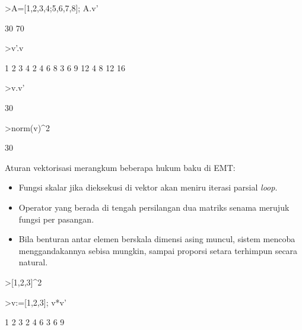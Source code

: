 \documentclass[a4paper,11pt,oneside,enabledeprecatedfontcommands]{scrbook}
\newenvironment{eulernotebook}{}{}
\newenvironment{eulercomment}{\par\medskip\noindent}{\par\medskip}
\begin{document}
\begin{eulernotebook}
\begin{eulerprompt}
>A=[1,2,3,4;5,6,7,8]; A.v'
\end{eulerprompt}
\begin{euleroutput}
           30 
           70 
\end{euleroutput}
\begin{eulerprompt}
>v'.v
\end{eulerprompt}
\begin{euleroutput}
            1             2             3             4 
            2             4             6             8 
            3             6             9            12 
            4             8            12            16 
\end{euleroutput}
\begin{eulerprompt}
>v.v'
\end{eulerprompt}
\begin{euleroutput}
30
\end{euleroutput}
\begin{eulerprompt}
>norm(v)^2
\end{eulerprompt}
\begin{euleroutput}
30
\end{euleroutput}
\begin{eulercomment}
Aturan vektorisasi merangkum beberapa hukum baku di EMT:
\begin{itemize}
    \item Fungsi skalar jika dieksekusi di vektor akan meniru iterasi parsial \emph{loop}.
    \item Operator yang berada di tengah persilangan dua matriks senama merujuk fungsi per pasangan.
    \item Bila benturan antar elemen berskala dimensi asing muncul, sistem mencoba menggandakannya sebisa mungkin, sampai proporsi setara terhimpun secara natural.
\end{itemize}
\end{eulercomment}
\begin{eulerprompt}
>[1,2,3]^2
\end{eulerprompt}
\begin{euleroutput}
[1,  4,  9]
\end{euleroutput}
\begin{eulerprompt}
>v:=[1,2,3]; v*v'
\end{eulerprompt}
\begin{euleroutput}
            1             2             3 
            2             4             6 
            3             6             9 
\end{euleroutput}

\end{eulernotebook}
\end{document}
